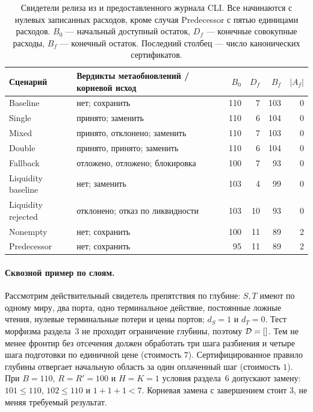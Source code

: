 \begin{table}[htbp]
\centering\small
\caption{Свидетели релиза из  и предоставленного журнала CLI. Все начинаются с нулевых записанных расходов, кроме случая Predecessor с пятью единицами расходов. $B_0$ --- начальный доступный остаток, $D_f$ --- конечные совокупные расходы, $B_f$ --- конечный остаток. Последний столбец --- число канонических сертификатов.}\label{tab:release-cases}
\begin{tabularx}{\linewidth}{@{}lXrrrr@{}}\toprule
Сценарий & Вердикты метаобновлений / корневой исход & $B_0$ & $D_f$ & $B_f$ & $|A_f|$\\\midrule
Baseline & нет; сохранить & 110 & 7 & 103 & 0\\
Single & принято; заменить & 110 & 6 & 104 & 0\\
Mixed & принято, отклонено; заменить & 110 & 7 & 103 & 0\\
Double & принято, принято; заменить & 110 & 6 & 104 & 0\\
Fallback & отложено, отложено; блокировка & 100 & 7 & 93 & 0\\
Liquidity baseline & нет; заменить & 103 & 4 & 99 & 0\\
Liquidity rejected & отклонено; отказ по ликвидности & 103 & 10 & 93 & 0\\
Nonempty & нет; сохранить & 100 & 11 & 89 & 2\\
Predecessor & нет; сохранить & 95 & 11 & 89 & 2\\\bottomrule
\end{tabularx}
\end{table}

\paragraph{Сквозной пример по слоям.}
Рассмотрим действительный свидетель препятствия по глубине: $S,T$ имеют по одному миру, два порта, одно терминальное действие, постоянные ложные чтения, нулевые терминальные потери и цены портов; $d_S=1$ и $d_T=0$. Тест морфизма раздела~3 не проходит ограничение глубины, поэтому $\mathcal D=[]$. Тем не менее фронтир без отсечения должен обработать три шага разбиения и четыре шага подготовки по единичной цене (стоимость $7$). Сертифицированное правило глубины отвергает начальную область за один оплаченный шаг (стоимость $1$). При $B=110$, $R=R'=100$ и $H=K=1$ условия раздела~6 допускают замену: $101\le110$, $102\le110$ и $1+1+1<7$. Корневая замена с завершением стоит $3$, не меняя требуемый результат.

